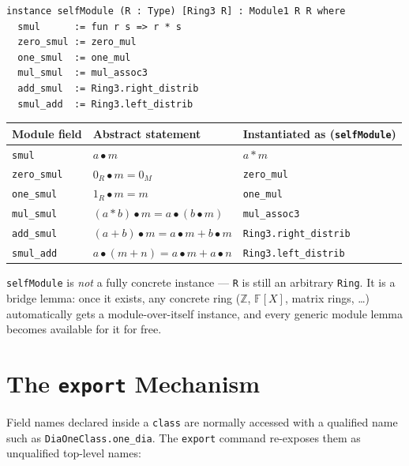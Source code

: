 \documentclass[11pt]{article}
\begin{document}
\begin{lstlisting}
instance selfModule (R : Type) [Ring3 R] : Module1 R R where
  smul      := fun r s => r * s
  zero_smul := zero_mul
  one_smul  := one_mul
  mul_smul  := mul_assoc3
  add_smul  := Ring3.right_distrib
  smul_add  := Ring3.left_distrib
\end{lstlisting}

\renewcommand{\arraystretch}{1.2}
\begin{center}
\begin{tabular}{@{}p{2.6cm}p{5.4cm}p{5.4cm}@{}}
\toprule
\textbf{Module field} & \textbf{Abstract statement} & \textbf{Instantiated as (\texttt{selfModule})} \\
\midrule
\texttt{smul}      & $a \bullet m$              & $a * m$ \\
\texttt{zero\_smul} & $0_R \bullet m = 0_M$      & \texttt{zero\_mul} \\
\texttt{one\_smul}  & $1_R \bullet m = m$        & \texttt{one\_mul} \\
\texttt{mul\_smul}  & $(a*b)\bullet m = a\bullet(b\bullet m)$ & \texttt{mul\_assoc3} \\
\texttt{add\_smul}  & $(a+b)\bullet m = a\bullet m + b\bullet m$ & \texttt{Ring3.right\_distrib} \\
\texttt{smul\_add}  & $a\bullet(m+n) = a\bullet m + a\bullet n$ & \texttt{Ring3.left\_distrib} \\
\bottomrule
\end{tabular}
\end{center}

\begin{takeaway}
\texttt{selfModule} is \emph{not} a fully concrete instance --- \texttt{R} is still an arbitrary \texttt{Ring}. It is a bridge lemma: once it exists, any concrete ring ($\mathbb{Z}$, $\mathbb{F}[X]$, matrix rings, \dots) automatically gets a module-over-itself instance, and every generic module lemma becomes available for it for free.
\end{takeaway}

\section{The \texttt{export} Mechanism}

Field names declared inside a \texttt{class} are normally accessed with a qualified name such as \texttt{DiaOneClass.one\_dia}. The \texttt{export} command re-exposes them as unqualified top-level names:
\end{document}
